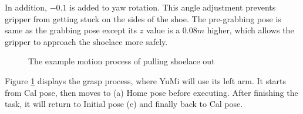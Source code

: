 In addition, $-0.1$ is added to yaw rotation. This angle adjustment prevents gripper from getting stuck on the sides of the shoe. The pre-grabbing pose is same as the grabbing pose except its $z$ value is a $0.08m$ higher, which allows the gripper to approach the shoelace more safely.

\begin{figure}[H]
\centering
{}
\caption{The example motion process of pulling shoelace out}
\label{pickexample}
\end{figure}

Figure \ref{pickexample} displays the grasp process, where YuMi will use its left arm. It starts from Cal pose, then moves to (a) Home pose before executing. After finishing the task, it will return to Initial pose (e) and finally back to Cal pose.